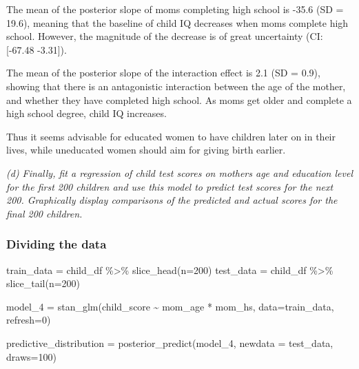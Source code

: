\documentclass[
]{article}
\newenvironment{Shaded}{\begin{snugshade}}{\end{snugshade}}
\newcommand{\AttributeTok}[1]{\textcolor[rgb]{0.77,0.63,0.00}{#1}}
\newcommand{\DecValTok}[1]{\textcolor[rgb]{0.00,0.00,0.81}{#1}}
\newcommand{\FunctionTok}[1]{\textcolor[rgb]{0.00,0.00,0.00}{#1}}
\newcommand{\NormalTok}[1]{#1}
\newcommand{\OtherTok}[1]{\textcolor[rgb]{0.56,0.35,0.01}{#1}}
\newcommand{\SpecialCharTok}[1]{\textcolor[rgb]{0.00,0.00,0.00}{#1}}
\begin{document}
The mean of the posterior slope of moms completing high school is -35.6
(SD = 19.6), meaning that the baseline of child IQ decreases when moms
complete high school. However, the magnitude of the decrease is of great
uncertainty (CI: {[}-67.48 -3.31{]}).

The mean of the posterior slope of the interaction effect is 2.1 (SD =
0.9), showing that there is an antagonistic interaction between the age
of the mother, and whether they have completed high school. As moms get
older and complete a high school degree, child IQ increases.

Thus it seems advisable for educated women to have children later on in
their lives, while uneducated women should aim for giving birth earlier.

\emph{(d) Finally, fit a regression of child test scores on mothers age
and education level for the first 200 children and use this model to
predict test scores for the next 200. Graphically display comparisons of
the predicted and actual scores for the final 200 children.}

\hypertarget{dividing-the-data}{%
\subsubsection{Dividing the data}\label{dividing-the-data}}

\begin{Shaded}
\begin{Highlighting}[]
\NormalTok{train\_data }\OtherTok{=}\NormalTok{ child\_df }\SpecialCharTok{\%\textgreater{}\%} \FunctionTok{slice\_head}\NormalTok{(}\AttributeTok{n=}\DecValTok{200}\NormalTok{)}
\NormalTok{test\_data }\OtherTok{=}\NormalTok{ child\_df }\SpecialCharTok{\%\textgreater{}\%} \FunctionTok{slice\_tail}\NormalTok{(}\AttributeTok{n=}\DecValTok{200}\NormalTok{)}
\end{Highlighting}
\end{Shaded}

\begin{Shaded}
\begin{Highlighting}[]
\NormalTok{model\_4 }\OtherTok{=} \FunctionTok{stan\_glm}\NormalTok{(child\_score }\SpecialCharTok{\textasciitilde{}}\NormalTok{ mom\_age }\SpecialCharTok{*}\NormalTok{ mom\_hs, }\AttributeTok{data=}\NormalTok{train\_data, }\AttributeTok{refresh=}\DecValTok{0}\NormalTok{)}

\NormalTok{predictive\_distribution }\OtherTok{=} \FunctionTok{posterior\_predict}\NormalTok{(model\_4, }\AttributeTok{newdata =}\NormalTok{ test\_data, }\AttributeTok{draws=}\DecValTok{100}\NormalTok{)}
\end{Highlighting}
\end{Shaded}
\end{document}
